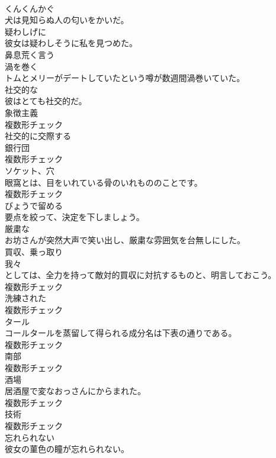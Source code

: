 \documentclass[8pt]{extreport}
\begin{document}
\begin{CJK}{UTF8}{min}
\\	[動詞]	くんくんかぐ	
\\	犬は見知らぬ人の匂いをかいだ。	
\\	[副詞]	疑わしげに	
\\	彼女は疑わしそうに私を見つめた。	
\\	[動詞]	鼻息荒く言う	
\\	[動詞]	渦を巻く	
\\	トムとメリーがデートしていたという噂が数週間渦巻いていた。	
\\	[形容詞]	社交的な	
\\	彼はとても社交的だ。	
\\	[名詞]	象徴主義	
\\	複数形チェック
\\	[動詞]	社交的に交際する	
\\	[名詞]	銀行団	
\\	複数形チェック
\\	[名詞]	ソケット、穴	
\\	眼窩とは、目をいれている骨のいれもののことです。	
\\	複数形チェック
\\	[動詞]	びょうで留める	
\\	要点を絞って、決定を下しましょう。	
\\	[形容詞]	厳粛な	
\\	お坊さんが突然大声で笑い出し、厳粛な雰囲気を台無しにした。	
\\	[名詞]	買収、乗っ取り	
\\	我々
\\	としては、全力を持って敵対的買収に対抗するものと、明言しておこう。	
\\	複数形チェック
\\	[名詞]	洗練された	
\\	複数形チェック
\\	[名詞]	タール	
\\	コールタールを蒸留して得られる成分名は下表の通りである。	
\\	複数形チェック
\\	[名詞]	南部	
\\	複数形チェック
\\	[名詞]	酒場	
\\	居酒屋で変なおっさんにからまれた。	
\\	複数形チェック
\\	[名詞]	技術	
\\	複数形チェック
\\	[形容詞]	忘れられない	
\\	彼女の菫色の瞳が忘れられない。	

\end{CJK}
\end{document}

